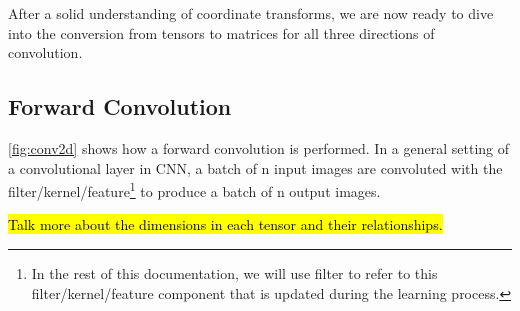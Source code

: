 After a solid understanding of coordinate transforms, we are now ready to dive into the
conversion from tensors to matrices for all three directions of convolution.
\subsection{Forward Convolution}

\Fig \ref{fig:conv2d} shows how a forward convolution is performed.
In a general setting of a convolutional layer in CNN, a batch of n input images are
convoluted with the filter/kernel/feature\footnote{
  In the rest of this documentation, we will use filter to refer to this
  filter/kernel/feature component that is updated during the learning process.
}
to produce a batch of n output images.

\hl{Talk more about the dimensions in each tensor and their relationships.}
{}
